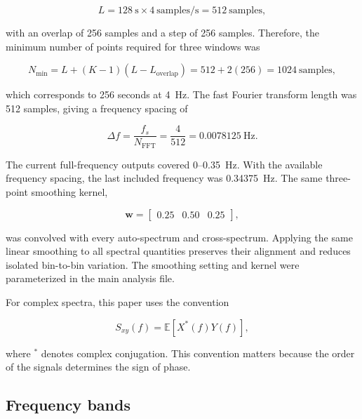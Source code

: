 \documentclass[12pt]{article}
\begin{document}
\begin{equation}
    L = 128\ \mathrm{s}\times 4\ \mathrm{samples/s}=512\ \mathrm{samples},
\end{equation}

with an overlap of 256 samples and a step of 256 samples. Therefore, the
minimum number of points required for three windows was

\begin{equation}
    N_{\min}=L+(K-1)(L-L_{\mathrm{overlap}})
    =512+2(256)=1024\ \mathrm{samples},
\end{equation}

which corresponds to 256 seconds at 4~Hz. The fast Fourier transform length
was 512 samples, giving a frequency spacing of

\begin{equation}
    \Delta f=\frac{f_s}{N_{\mathrm{FFT}}}
    =\frac{4}{512}=0.0078125\ \mathrm{Hz}.
\end{equation}

The current full-frequency outputs covered 0--0.35~Hz. With the available
frequency spacing, the last included frequency was 0.34375~Hz. The same
three-point smoothing kernel,

\begin{equation}
    \mathbf{w}=\begin{bmatrix}0.25 & 0.50 & 0.25\end{bmatrix},
    \label{eq:smoothing_kernel}
\end{equation}

was convolved with every auto-spectrum and cross-spectrum. Applying the same
linear smoothing to all spectral quantities preserves their alignment and
reduces isolated bin-to-bin variation. The smoothing setting and kernel were
parameterized in the main analysis file.

For complex spectra, this paper uses the convention

\begin{equation}
    S_{xy}(f)=\mathbb{E}\!\left[X^*(f)Y(f)\right],
    \label{eq:cross_spectrum_convention}
\end{equation}

where $^*$ denotes complex conjugation. This convention matters because the
order of the signals determines the sign of phase.

\subsection{Frequency bands}
\end{document}
